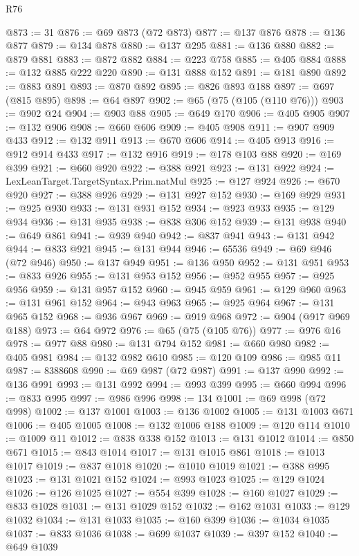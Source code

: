 \begin{lexlean}{R76}
\begin{coremodule}
@873 := 31
@876 := @69 @873 (@72 @873)
@877 := @137 @876
@878 := @136 @877
@879 := @134 @878
@880 := @137 @295
@881 := @136 @880
@882 := @879 @881
@883 := @872 @882
@884 := @223 @758
@885 := @405 @884
@888 := @132 @885 @222 @220
@890 := @131 @888 @152
@891 := @181 @890
@892 := @883 @891
@893 := @870 @892
@895 := @826 @893 @188
@897 := @697 (@815 @895)
@898 := @64 @897
@902 := @65 (@75 (@105 (@110 @76)))
@903 := @902 @24
@904 := @903 @88
@905 := @649 @170
@906 := @405 @905
@907 := @132 @906
@908 := @660 @606
@909 := @405 @908
@911 := @907 @909 @433
@912 := @132 @911
@913 := @670 @606
@914 := @405 @913
@916 := @912 @914 @433
@917 := @132 @916
@919 := @178 @103 @88
@920 := @169 @399
@921 := @660 @920
@922 := @388 @921
@923 := @131 @922
@924 := LexLeanTarget.TargetSyntax.Prim.natMul
@925 := @127 @924
@926 := @670 @920
@927 := @388 @926
@929 := @131 @927 @152
@930 := @169 @929
@931 := @925 @930
@933 := @131 @931 @152
@934 := @923 @933
@935 := @129 @934
@936 := @131 @935
@938 := @838 @306 @152
@939 := @131 @938
@940 := @649 @861
@941 := @939 @940
@942 := @837 @941
@943 := @131 @942
@944 := @833 @921
@945 := @131 @944
@946 := 65536
@949 := @69 @946 (@72 @946)
@950 := @137 @949
@951 := @136 @950
@952 := @131 @951
@953 := @833 @926
@955 := @131 @953 @152
@956 := @952 @955
@957 := @925 @956
@959 := @131 @957 @152
@960 := @945 @959
@961 := @129 @960
@963 := @131 @961 @152
@964 := @943 @963
@965 := @925 @964
@967 := @131 @965 @152
@968 := @936 @967
@969 := @919 @968
@972 := @904 (@917 @969 @188)
@973 := @64 @972
@976 := @65 (@75 (@105 @76))
@977 := @976 @16
@978 := @977 @88
@980 := @131 @794 @152
@981 := @660 @980
@982 := @405 @981
@984 := @132 @982 @610
@985 := @120 @109
@986 := @985 @11
@987 := 8388608
@990 := @69 @987 (@72 @987)
@991 := @137 @990
@992 := @136 @991
@993 := @131 @992
@994 := @993 @399
@995 := @660 @994
@996 := @833 @995
@997 := @986 @996
@998 := 134
@1001 := @69 @998 (@72 @998)
@1002 := @137 @1001
@1003 := @136 @1002
@1005 := @131 @1003 @671
@1006 := @405 @1005
@1008 := @132 @1006 @188
@1009 := @120 @114
@1010 := @1009 @11
@1012 := @838 @338 @152
@1013 := @131 @1012
@1014 := @850 @671
@1015 := @843 @1014
@1017 := @131 @1015 @861
@1018 := @1013 @1017
@1019 := @837 @1018
@1020 := @1010 @1019
@1021 := @388 @995
@1023 := @131 @1021 @152
@1024 := @993 @1023
@1025 := @129 @1024
@1026 := @126 @1025
@1027 := @554 @399
@1028 := @160 @1027
@1029 := @833 @1028
@1031 := @131 @1029 @152
@1032 := @162 @1031
@1033 := @129 @1032
@1034 := @131 @1033
@1035 := @160 @399
@1036 := @1034 @1035
@1037 := @833 @1036
@1038 := @699 @1037
@1039 := @397 @152
@1040 := @649 @1039

\end{coremodule}
\end{lexlean}
